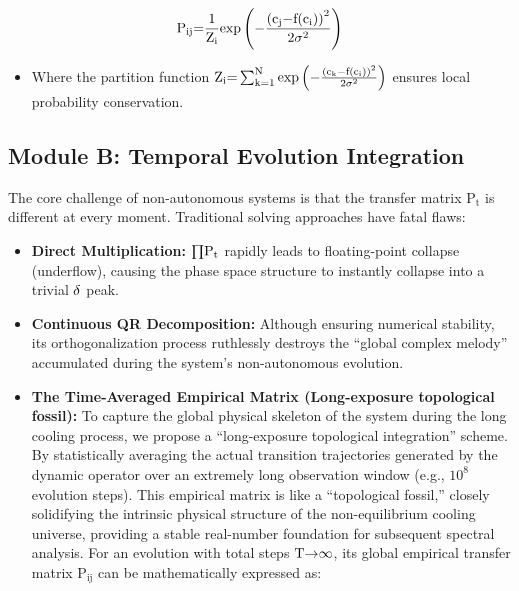 \documentclass[fractalfract,article,submit,oneauthor,pdftex]{Definitions/mdpi}
\begin{document}
\begin{equation}
\text{P}_{\text{ij}}\text{=}\frac{\text{1}}{\text{Z}_{\text{i}}}\text{exp}\left( \text{\ensuremath{-}}\frac{\text{(}\text{c}_{\text{j}}\text{\ensuremath{-}}\text{f}\text{(}\text{c}_{\text{i}}\text{)}\text{)}^{\text{2}}}{\text{2}\text{\ensuremath{\sigma}}^{\text{2}}} \right)
\end{equation}

\begin{itemize}
\item
  Where the partition function
  \(\text{Z}_{\text{i}}\text{=}\sum_{\text{k}\text{=1}}^{\text{N}}\text{exp}\left( \text{\ensuremath{-}}\frac{\text{(}\text{c}_{\text{k}}\text{\ensuremath{-}}\text{f}\text{(}\text{c}_{\text{i}}\text{)}\text{)}^{\text{2}}}{\text{2}\text{\ensuremath{\sigma}}^{\text{2}}} \right)\)
  ensures local probability conservation.
\end{itemize}

\subsection{Module B: Temporal Evolution Integration}

The core challenge of non-autonomous systems is that the transfer matrix
\(\text{P}_{\text{t}}\) is different at every moment. Traditional
solving approaches have fatal flaws:

\begin{itemize}
\item
  \textbf{Direct Multiplication:} \(\text{\ensuremath{\prod}}\text{P}_{\text{t}}\)
  rapidly leads to floating-point collapse (underflow), causing the
  phase space structure to instantly collapse into a trivial
  \(\text{\ensuremath{\delta}}\) peak.
\item
  \textbf{Continuous QR Decomposition:} Although ensuring numerical
  stability, its orthogonalization process ruthlessly destroys the
  ``global complex melody'' accumulated during the system's
  non-autonomous evolution.
\item
  \textbf{The Time-Averaged Empirical Matrix (Long-exposure topological
  fossil):} To capture the global physical skeleton of the system during
  the long cooling process, we propose a ``long-exposure topological
  integration'' scheme. By statistically averaging the actual transition
  trajectories generated by the dynamic operator over an extremely long
  observation window (e.g., \(\text{10}^{\text{8}}\) evolution steps).
  This empirical matrix is like a ``topological fossil,'' closely
  solidifying the intrinsic physical structure of the non-equilibrium
  cooling universe, providing a stable real-number foundation for
  subsequent spectral analysis. For an evolution with total steps
  \(\text{T}\text{\ensuremath{\rightarrow}\ensuremath{\infty}}\), its global empirical transfer matrix
  \(\text{P}_{\text{ij}}\) can be mathematically expressed as:
\end{itemize}
\end{document}
